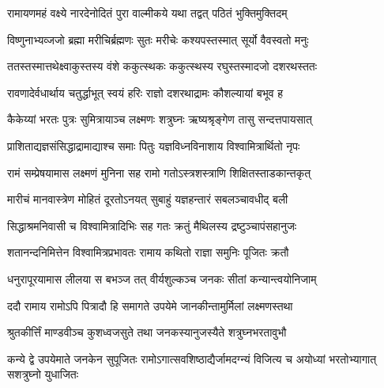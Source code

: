 

\storymeta


\twolineshloka
{रामायणमहं वक्ष्ये नारदेनोदितं पुरा}
{वाल्मीकये यथा तद्वत् पठितं भुक्तिमुक्तिदम्} %

\twolineshloka
{विष्णुनाभ्यव्जजो ब्रह्मा मरीचिर्ब्रह्मणः सुतः}
{मरीचेः कश्यपस्तस्मात् सूर्यो वैवस्वतो मनुः} %

\twolineshloka
{ततस्तस्मात्तथेक्ष्वाकुस्तस्य वंशे ककुत्स्थकः}
{ककुत्स्थस्य रघुस्तस्मादजो दशरथस्ततः} %

\twolineshloka
{रावणादेर्वधार्थाय चतुर्द्धाभूत् स्वयं हरिः}
{राज्ञो दशरथाद्रामः कौशल्यायां बभूव ह} %

\twolineshloka
{कैकेय्यां भरतः पुत्रः सुमित्रायाञ्च लक्ष्मणः}
{शत्रुघ्नः ऋष्यश्रृङ्गेण तासु सन्दत्तपायसात्} %

\twolineshloka
{प्राशिताद्यज्ञसंसिद्धाद्रामाद्याश्च समाः पितुः}
{यज्ञविध्नविनाशाय विश्वामित्रार्थितो नृपः} %

\twolineshloka
{रामं सम्प्रेषयामास लक्ष्मणं मुनिना सह}
{रामो गतोऽस्त्रशस्त्राणि शिक्षितस्ताडकान्तकृत्} %

\twolineshloka
{मारीचं मानवास्त्रेण मोहितं दूरतोऽनयत्}
{सुबाहुं यज्ञहन्तारं सबलञ्चावधीद् बली} %

\twolineshloka
{सिद्धाश्रमनिवासी च विश्वामित्रादिभिः सह}
{गतः क्रतुं मैथिलस्य द्रष्टुञ्चापंसहानुजः} %

\twolineshloka
{शतानन्दनिमित्तेन विश्वामित्रप्रभावतः}
{रामाय कथितो राज्ञा समुनिः पूजितः क्रतौ} %

\twolineshloka
{धनुरापूरयामास लीलया स बभञ्ज तत् }
{वीर्यशुल्कञ्च जनकः सीतां कन्यान्त्वयोनिजाम्} %

\twolineshloka
{ददौ रामाय रामोऽपि पित्रादौ हि समागते}
{उपयेमे जानकीन्तामुर्मिलां लक्ष्मणस्तथा} %

\twolineshloka
{श्रुतकीर्त्तिं माण्डवीञ्च कुशध्वजसुते तथा}
{जनकस्यानुजस्यैते शत्रुघ्नभरतावुभौ} %

\threelineshloka
{कन्ये द्वे उपयेमाते जनकेन सुपूजितः}
{रामोऽगात्सवशिष्ठाद्यैर्जामदग्न्यं विजित्य च}
{अयोध्यां भरतोभ्यागात् सशत्रुघ्नो युधाजितः} %

